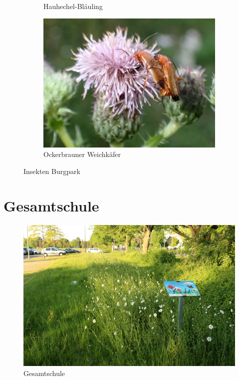 \documentclass[11pt]{article}
\begin{document}
\begin{figure}[h!]
\begin{subfigure}[b]{0.48\linewidth}
    \caption{Hauhechel-Bläuling}
  \end{subfigure}
  \begin{subfigure}[b]{0.43\linewidth}
    \includegraphics[width=\linewidth]{img/weichkaefer.jpg}
    \caption{Ockerbrauner Weichkäfer}
  \end{subfigure}
  \caption{Insekten Burgpark}
\end{figure}

\newpage
\section{Gesamtschule}
\begin{figure}[h!]
  \includegraphics[width=\linewidth]{img/gesamtschule/mai.jpg}
  \caption{Gesamtschule}
  \label{fig:boat1}
\end{figure}
\end{document}
